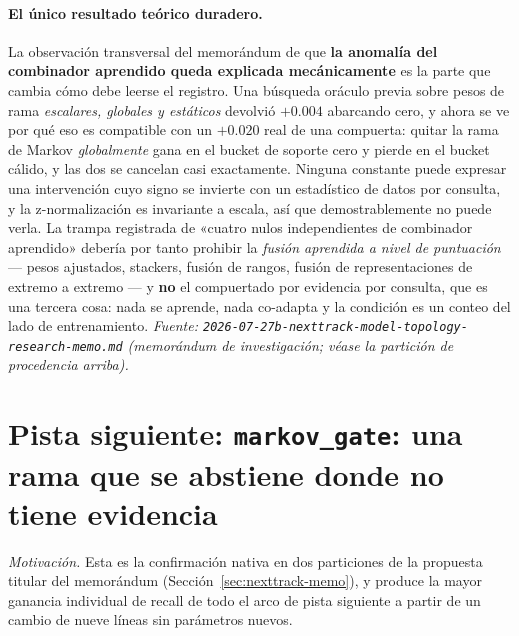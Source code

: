 \documentclass[11pt]{article}
\begin{document}
\paragraph{El único resultado teórico duradero.} La observación transversal del
memorándum de que \textbf{la anomalía del combinador aprendido queda explicada
mecánicamente} es la parte que cambia cómo debe leerse el registro. Una búsqueda
oráculo previa sobre pesos de rama \emph{escalares, globales y estáticos} devolvió
$+\num{0.004}$ abarcando cero, y ahora se ve por qué eso es compatible con un
$+\num{0.020}$ real de una compuerta: quitar la rama de Markov \emph{globalmente}
gana en el bucket de soporte cero y pierde en el bucket cálido, y las dos se
cancelan casi exactamente. Ninguna constante puede expresar una intervención cuyo
signo se invierte con un estadístico de datos por consulta, y la z-normalización es
invariante a escala, así que demostrablemente no puede verla. La trampa registrada
de «cuatro nulos independientes de combinador aprendido» debería por tanto prohibir
la \emph{fusión aprendida a nivel de puntuación} --- pesos ajustados, stackers,
fusión de rangos, fusión de representaciones de extremo a extremo --- y
\textbf{no} el compuertado por evidencia por consulta, que es una tercera cosa:
nada se aprende, nada co-adapta y la condición es un conteo del lado de
entrenamiento.
\emph{Fuente: \texttt{2026-07-27b-nexttrack-model-topology-research-memo.md}
(memorándum de investigación; véase la partición de procedencia arriba).}

\section{Pista siguiente: \texttt{markov\_gate}: una rama que se abstiene donde no tiene evidencia}
\label{sec:nexttrack-markovgate}
\emph{Motivación.} Esta es la confirmación nativa en dos particiones de la
propuesta titular del memorándum (Sección~\ref{sec:nexttrack-memo}), y produce la mayor
ganancia individual de recall de todo el arco de pista siguiente a partir de un
cambio de nueve líneas sin parámetros nuevos.
\end{document}
